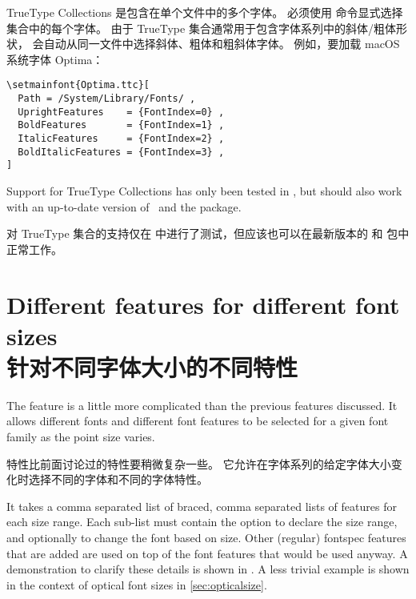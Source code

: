 \documentclass[a4paper]{l3doc}
\begin{document}
TrueType Collections 是包含在单个文件中的多个字体。
必须使用  命令显式选择集合中的每个字体。
由于 TrueType 集合通常用于包含字体系列中的斜体/粗体形状， 会自动从同一文件中选择斜体、粗体和粗斜体字体。
例如，要加载 macOS 系统字体 Optima：

\begin{Verbatim}
\setmainfont{Optima.ttc}[
  Path = /System/Library/Fonts/ ,
  UprightFeatures    = {FontIndex=0} ,
  BoldFeatures       = {FontIndex=1} ,
  ItalicFeatures     = {FontIndex=2} ,
  BoldItalicFeatures = {FontIndex=3} ,
]
\end{Verbatim}
Support for TrueType Collections has only been tested in \XeTeX, but should also work with an up-to-date version of \LuaTeX\ and the  package.

对 TrueType 集合的支持仅在 \XeTeX 中进行了测试，但应该也可以在最新版本的 \LuaTeX 和  包中正常工作。

\section{Different features for different font sizes\\针对不同字体大小的不同特性}
\label{sec:sizefeature}


The  feature is a little more complicated
than the previous features discussed. It allows different fonts
and different font features to be selected for a given font
family as the point size varies.

 特性比前面讨论过的特性要稍微复杂一些。
它允许在字体系列的给定字体大小变化时选择不同的字体和不同的字体特性。

It takes a comma separated list of braced, comma separated lists of features for each size range.
Each sub-list must contain the  option
to declare the size range, and optionally  to change the
font based on size. Other (regular) fontspec features that are added
are used on top of the font features that would be used anyway.
A demonstration to clarify these details is shown in .
A less trivial example is shown in the context of optical font sizes
in \vref{sec:opticalsize}.
\end{document}
